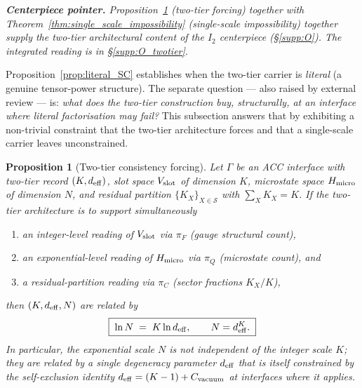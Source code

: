 \documentclass[11pt]{article}
\theoremstyle{plain}
\newtheorem{proposition}[theorem]{Proposition}
\theoremstyle{definition}
\theoremstyle{remark}
\begin{document}
\noindent\textit{\textbf{Centerpiece pointer.}  Proposition~\ref{prop:two_tier_forcing} (two-tier forcing) together with Theorem~\ref{thm:single_scale_impossibility} (single-scale impossibility) together supply the two-tier architectural content of the $I_2$ centerpiece (\S\ref{supp:O}).  The integrated reading is in \S\ref{supp:O_twotier}.}

\medskip

Proposition~\ref{prop:literal_SC} establishes when the two-tier carrier is \emph{literal} (a genuine tensor-power structure).  The separate question --- also raised by external review --- is: \emph{what does the two-tier construction buy, structurally, at an interface where literal factorisation may fail?}  This subsection answers that by exhibiting a non-trivial constraint that the two-tier architecture forces and that a single-scale carrier leaves unconstrained.

\begin{proposition}[Two-tier consistency forcing]\label{prop:two_tier_forcing}
Let $\Gamma$ be an ACC interface with two-tier record $(K, d_{\rm eff})$, slot space $V_{\rm slot}$ of dimension $K$, microstate space $H_{\rm micro}$ of dimension $N$, and residual partition $\{K_X\}_{X \in \mathcal{S}}$ with $\sum_X K_X = K$.  If the two-tier architecture is to support simultaneously
\begin{enumerate}[leftmargin=2.5em,label=\textup{(\arabic*)},itemsep=3pt]
  \item an integer-level reading of $V_{\rm slot}$ via $\pi_F$ (gauge structural count),
  \item an exponential-level reading of $H_{\rm micro}$ via $\pi_Q$ (microstate count), and
  \item a residual-partition reading via $\pi_C$ (sector fractions $K_X / K$),
\end{enumerate}
then $(K, d_{\rm eff}, N)$ are related by
\[
  \boxed{\; \ln N \;=\; K \ln d_{\rm eff}, \qquad N = d_{\rm eff}^K. \;}
\]
In particular, the exponential scale $N$ is not independent of the integer scale $K$; they are related by a single degeneracy parameter $d_{\rm eff}$ that is itself constrained by the self-exclusion identity $d_{\rm eff} = (K-1) + C_{\rm vacuum}$ at interfaces where it applies.
\end{proposition}
\end{document}
